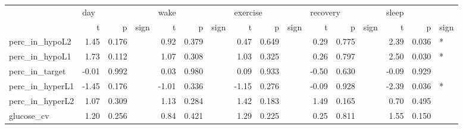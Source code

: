 \begin{tabular}{lrrlrrlrrlrrlrrl}
\toprule
{} & \multicolumn{3}{l}{day} & \multicolumn{3}{l}{wake} & \multicolumn{3}{l}{exercise} & \multicolumn{3}{l}{recovery} & \multicolumn{3}{l}{sleep} \\
{} &     t &      p & sign &     t &      p & sign &        t &      p & sign &        t &      p & sign &     t &      p & sign \\
\midrule
perc_in_hypoL2  &  1.45 &  0.176 &      &  0.92 &  0.379 &      &     0.47 &  0.649 &      &     0.29 &  0.775 &      &  2.39 &  0.036 &    * \\
perc_in_hypoL1  &  1.73 &  0.112 &      &  1.07 &  0.308 &      &     1.03 &  0.325 &      &     0.26 &  0.797 &      &  2.50 &  0.030 &    * \\
perc_in_target  & -0.01 &  0.992 &      &  0.03 &  0.980 &      &     0.09 &  0.933 &      &    -0.50 &  0.630 &      & -0.09 &  0.929 &      \\
perc_in_hyperL1 & -1.45 &  0.176 &      & -1.01 &  0.336 &      &    -1.15 &  0.276 &      &    -0.09 &  0.928 &      & -2.39 &  0.036 &    * \\
perc_in_hyperL2 &  1.07 &  0.309 &      &  1.13 &  0.284 &      &     1.42 &  0.183 &      &     1.49 &  0.165 &      &  0.70 &  0.495 &      \\
glucose_cv      &  1.20 &  0.256 &      &  0.84 &  0.421 &      &     1.29 &  0.225 &      &     0.25 &  0.811 &      &  1.55 &  0.150 &      \\
\bottomrule
\end{tabular}
